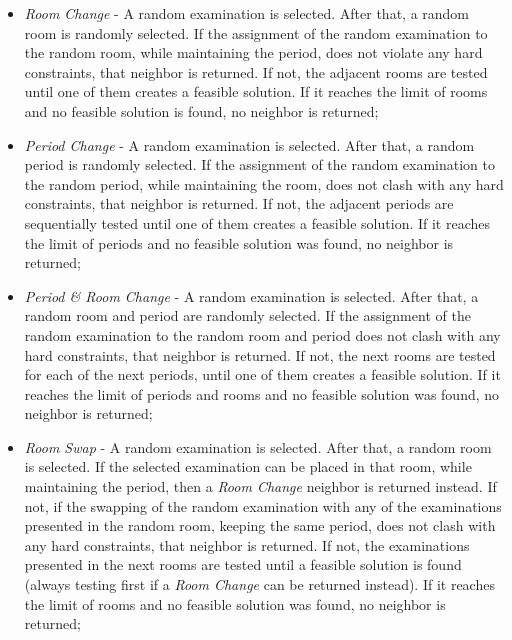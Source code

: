 \begin{itemize}
	\item \textit{Room Change} - A random examination is selected. After that, a random room is randomly selected. If the assignment of the random examination to the random room, while maintaining the period, does not violate any hard constraints, that neighbor is returned. If not, the adjacent rooms are tested until one of them creates a feasible solution. If it reaches the limit of rooms and no feasible solution is found, no neighbor is returned;\\
	
	\item \textit{Period Change} - A random examination is selected. After that, a random period is randomly selected. If the assignment of the random examination to the random period, while maintaining the room, does not clash with any hard constraints, that neighbor is returned. If not, the adjacent periods are sequentially tested until one of them creates a feasible solution. If it reaches the limit of periods and no feasible solution was found, no neighbor is returned;\\
	
	\item \textit{Period \& Room Change} - A random examination is selected. After that, a random room and period are randomly selected. If the assignment of the random examination to the random room and period does not clash with any hard constraints, that neighbor is returned. If not, the next rooms are tested for each of the next periods, until one of them creates a feasible solution. If it reaches the limit of periods and rooms and no feasible solution was found, no neighbor is returned;\\
	
	\item \textit{Room Swap} - A random examination is selected. After that, a random room is selected. If the selected examination can be placed in that room, while maintaining the period, then a \textit{Room Change} neighbor is returned instead. If not, if the swapping of the random examination with any of the examinations presented in the random room, keeping the same period, does not clash with any hard constraints, that neighbor is returned. If not, the examinations presented in the next rooms are tested until a feasible solution is found (always testing first if a \textit{Room Change} can be returned instead). If it reaches the limit of rooms and no feasible solution was found, no neighbor is returned;\\
	

\end{itemize}
